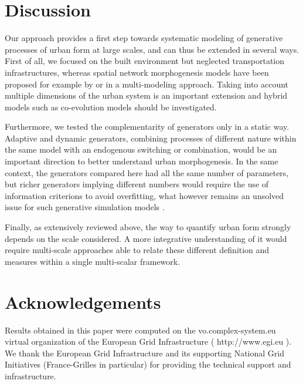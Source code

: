 \documentclass[letterpaper]{article}
\begin{document}
\section{Discussion} \label{sec:discussion}


Our approach provides a first step towards systematic modeling of generative processes of urban form at large scales, and can thus be extended in several ways.
First of all, we focused on the built environment but neglected transportation infrastructures, whereas spatial network morphogenesis models have been proposed for example by \cite{courtat2011mathematics} or \cite{raimbault2018multi} in a multi-modeling approach.
Taking into account multiple dimensions of the urban system is an important extension and hybrid models such as co-evolution models \citep{raimbault2014hybrid} should be investigated.

Furthermore, we tested the complementarity of generators only in a static way. Adaptive and dynamic generators, combining processes of different nature within the same model with an endogenous switching or combination, would be an important direction to better understand urban morphogenesis.
In the same context, the generators compared here had all the same number of parameters, but richer generators implying different numbers would require the use of information criterions to avoid overfitting, what however remains an unsolved issue for such generative simulation models \citep{piou2009proposing}.

Finally, as extensively reviewed above, the way to quantify urban form strongly depends on the scale considered. A more integrative understanding of it would require multi-scale approaches able to relate these different definition and measures within a single multi-scalar framework.








\section{Acknowledgements}

Results obtained in this paper were computed on the vo.complex-system.eu virtual organization of the European Grid Infrastructure ( http://www.egi.eu ). We thank the European Grid Infrastructure and its supporting National Grid Initiatives (France-Grilles in particular) for providing the technical support and infrastructure.

\footnotesize

\end{document}
